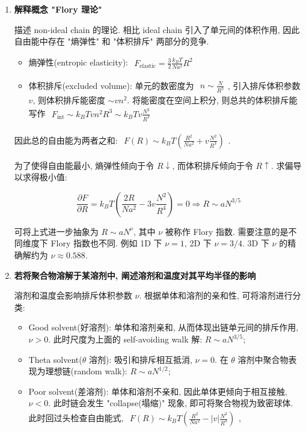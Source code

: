 \documentclass[../../main.tex]{subfiles}
\begin{document}
\begin{enumerate}
    \item \textbf{解释概念 "Flory 理论"}

描述 non-ideal chain 的理论. 相比 ideal chain 引入了单元间的体积作用, 因此自由能中存在 "熵弹性" 和 "体积排斥" 两部分的竞争. 

\begin{itemize}
    \item 熵弹性(entropic elasticity): $\begin{aligned}
        F_{\text{elastic}} = \frac{3}{2}\frac{k_{B}T}{Na^{2}}R^{2}
    \end{aligned}$

    \item 体积排斥(excluded volume): 单元的数密度为 $\begin{aligned}
        n\sim \frac{N}{R^{3}}
    \end{aligned}$, 引入排斥体积参数 $v$, 则体积排斥能密度 $\sim vn^{2}$. 将能密度在空间上积分, 则总共的体积排斥能写作 $\begin{aligned}
        F_{\text{int}}\sim k_{B}T vn^{2}R^{3} \sim k_{B}T v\frac{N^{2}}{R^{3}}
    \end{aligned}$
\end{itemize}

因此总的自由能为两者之和: $\begin{aligned}
    F(R) \sim k_{B}T \left(
    \frac{R^{2}}{Na^{2}} + v\frac{N^{2}}{R^{3}}
\right)
\end{aligned}$. 

为了使得自由能最小, 熵弹性倾向于令 $R\downarrow$, 而体积排斥倾向于令 $R\uparrow$. 求偏导以求得极小值: 

$$
\frac{\partial F}{\partial R} = k_{B}T \left(
    \frac{2R}{Na^{2}} - 3v\frac{N^{2}}{R^{4}}
\right) = 0 \Rightarrow R \sim aN^{3/5}
$$

可将上式进一步抽象为 $R\sim aN^{\nu}$, 其中 $\nu$ 被称作 Flory 指数. 需要注意的是不同维度下 Flory 指数也不同. 例如 1D 下 $\nu = 1$, 2D 下 $\nu = 3/4$. 3D 下 $\nu$ 的精确解约为 $\nu\approx 0.588$. 

    \item \textbf{若将聚合物溶解于某溶剂中, 阐述溶剂和温度对其平均半径的影响}

溶剂和温度会影响排斥体积参数 $\nu$. 根据单体和溶剂的亲和性, 可将溶剂进行分类: 

\begin{itemize}
    \item Good solvent(好溶剂): 单体和溶剂亲和, 从而体现出链单元间的排斥作用, $\nu>0$. 此时尺度为上面的 self-avoiding walk 解: $R\sim aN^{3/5}$;
    \item Theta solvent($\theta$ 溶剂): 吸引和排斥相互抵消, $\nu=0$. 在 $\theta$ 溶剂中聚合物表现为理想链(random walk): $R\sim aN^{1/2}$;
    \item Poor solvent(差溶剂): 单体和溶剂不亲和, 因此单体更倾向于相互接触, $\nu < 0$. 此时链会发生 "collapse(塌缩)" 现象, 即可将聚合物视为致密球体. 此时回过头检查自由能式, $\begin{aligned}
        F(R)\sim k_{B}T \left(
    \frac{R^{2}}{Na^{2}} - |v|\frac{N^{2}}{R^{3}}
\right)
    \end{aligned}$, 


\end{itemize}
\end{enumerate}
\end{document}
